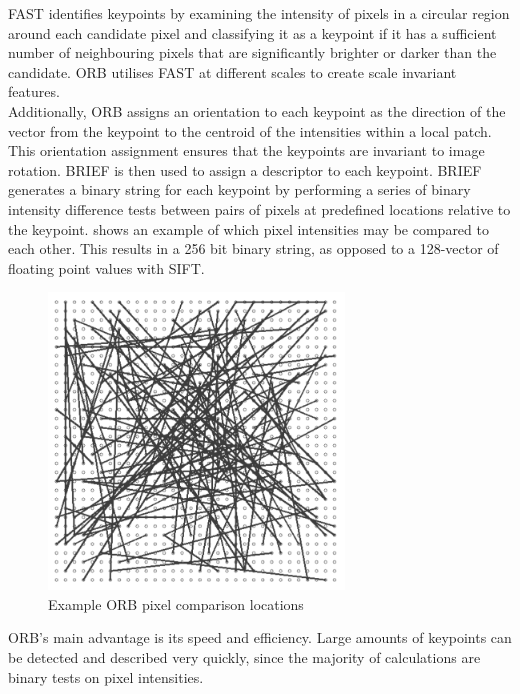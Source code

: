 FAST identifies keypoints by examining the intensity of pixels in a circular region around each candidate pixel and classifying it as a keypoint if it has a sufficient number of neighbouring pixels that are significantly brighter or darker than the candidate. ORB utilises FAST at different scales to create scale invariant features.\\

Additionally, ORB assigns an orientation to each keypoint as the direction of the vector from the keypoint to the centroid of the intensities within a local patch. This orientation assignment ensures that the keypoints are invariant to image rotation.
BRIEF is then used to assign a descriptor to each keypoint. BRIEF generates a binary string for each keypoint by performing a series of binary intensity difference tests between pairs of pixels at predefined locations relative to the keypoint.  shows an example of which pixel intensities may be compared to each other. This results in a 256 bit binary string, as opposed to a 128-vector of floating point values with SIFT.\\

\begin{figure}[ht]
    \centering
    \includegraphics[width=0.7\textwidth]{figures/ORB.png}
    \caption{Example ORB pixel comparison locations \cite{BRIEF}}
    \label{fig:ORB}
\end{figure}

ORB's main advantage is its speed and efficiency. Large amounts of keypoints can be detected and described very quickly, since the majority of calculations are binary tests on pixel intensities.\\


